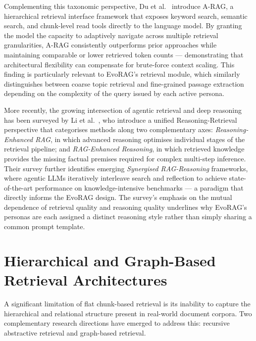 Complementing this taxonomic perspective, Du et al.~\cite{du2026arag} introduce
A-RAG, a hierarchical retrieval interface framework that exposes keyword search,
semantic search, and chunk-level read tools directly to the language model.
By granting the model the capacity to adaptively navigate across multiple retrieval
granularities, A-RAG consistently outperforms prior approaches while maintaining
comparable or lower retrieved token counts — demonstrating that architectural
flexibility can compensate for brute-force context scaling.
This finding is particularly relevant to EvoRAG's retrieval module, which similarly
distinguishes between coarse topic retrieval and fine-grained passage extraction
depending on the complexity of the query issued by each active persona.
 
More recently, the growing intersection of agentic retrieval and deep reasoning has
been surveyed by Li et al.~\cite{li2025ragreas}, who introduce a unified
Reasoning-Retrieval perspective that categorises methods along two complementary
axes: \emph{Reasoning-Enhanced RAG}, in which advanced reasoning optimises
individual stages of the retrieval pipeline; and \emph{RAG-Enhanced Reasoning}, in
which retrieved knowledge provides the missing factual premises required for complex
multi-step inference.
Their survey further identifies emerging \emph{Synergised RAG-Reasoning} frameworks,
where agentic LLMs iteratively interleave search and reflection to achieve
state-of-the-art performance on knowledge-intensive benchmarks — a paradigm that
directly informs the EvoRAG design.
The survey's emphasis on the mutual dependence of retrieval quality and reasoning
quality underlines why EvoRAG's personas are each assigned a distinct reasoning
style rather than simply sharing a common prompt template.

\section{Hierarchical and Graph-Based Retrieval Architectures}

A significant limitation of flat chunk-based retrieval is its inability to capture
the hierarchical and relational structure present in real-world document corpora.
Two complementary research directions have emerged to address this: recursive
abstractive retrieval and graph-based retrieval.

